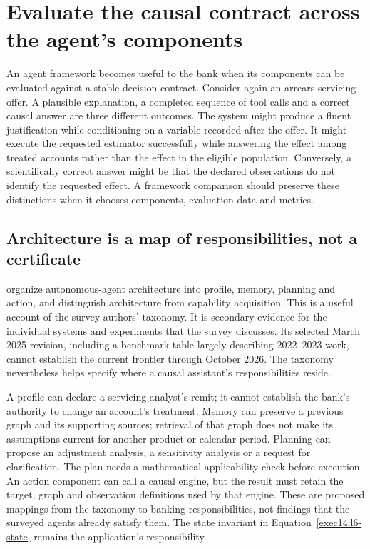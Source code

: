 \section{Evaluate the causal contract across the agent's components}
\label{exec18:framework-evaluation}

An agent framework becomes useful to the bank when its components can be
evaluated against a stable decision contract. Consider again an arrears
servicing offer. A plausible explanation, a completed sequence of tool calls
and a correct causal answer are three different outcomes. The system might
produce a fluent justification while conditioning on a variable recorded
after the offer. It might execute the requested estimator successfully while
answering the effect among treated accounts rather than the effect in the
eligible population. Conversely, a scientifically correct answer might be
that the declared observations do not identify the requested effect. A
framework comparison should preserve these distinctions when it chooses
components, evaluation data and metrics.

\subsection{Architecture is a map of responsibilities, not a certificate}

\citet{exec18_framework_agents_survey} organize autonomous-agent architecture
into profile, memory, planning and action, and distinguish architecture from
capability acquisition. This is a useful account of the survey authors'
taxonomy. It is secondary evidence for the individual systems and experiments
that the survey discusses. Its selected March 2025 revision, including a
benchmark table largely describing 2022--2023 work, cannot establish the
current frontier through October 2026. The taxonomy nevertheless helps
specify where a causal assistant's responsibilities reside.

A profile can declare a servicing analyst's remit; it cannot establish the
bank's authority to change an account's treatment. Memory can preserve a
previous graph and its supporting sources; retrieval of that graph does not
make its assumptions current for another product or calendar period.
Planning can propose an adjustment analysis, a sensitivity analysis or a
request for clarification. The plan needs a mathematical applicability
check before execution. An action component can call a causal engine, but
the result must retain the target, graph and observation definitions used
by that engine. These are proposed mappings from the taxonomy to banking
responsibilities, not findings that the surveyed agents already satisfy
them. The state invariant in Equation~\ref{exec14:l6-state} remains the
application's responsibility.

